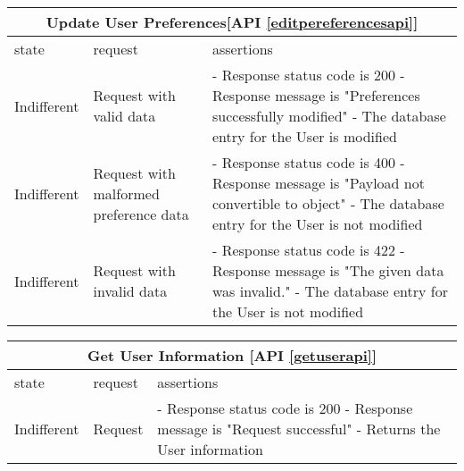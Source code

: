 \begin{center}
	\begin{tabular}{|p{}|p{}|p{}|}
		\hline
		\multicolumn{3}{c}{Update User Preferences[API \ref{editpereferencesapi}]}\\
		
		\hline
		state & request & assertions \\
		
		\hline
		Indifferent &
		Request with valid data & 
		- Response status code is 200 \newline
		- Response message is "Preferences successfully modified" \newline
		- The database entry for the User is modified 
		\\
				
		\hline
		Indifferent &
		Request with malformed preference data & 
		- Response status code is 400 \newline
		- Response message is "Payload not convertible to object" \newline
		- The database entry for the User is not modified
		\\
		
		
		\hline
		Indifferent  &
		Request with invalid data & 
		- Response status code is 422 \newline
		- Response message is "The given data was invalid." \newline
		- The database entry for the User is not modified
		\\
		
		
		\hline
		
	\end{tabular}
\end{center}

\begin{center}
	\begin{tabular}{|p{}|p{}|p{}|}
		\hline
		\multicolumn{3}{c}{Get User Information [API \ref{getuserapi}]}\\
		
		\hline
		state & request & assertions \\
		
		
		\hline
		Indifferent &
		Request & 
		- Response status code is 200 \newline
		- Response message is "Request successful" \newline
		- Returns the User information
		\\
		
		
		\hline
		
	\end{tabular}
\end{center}

